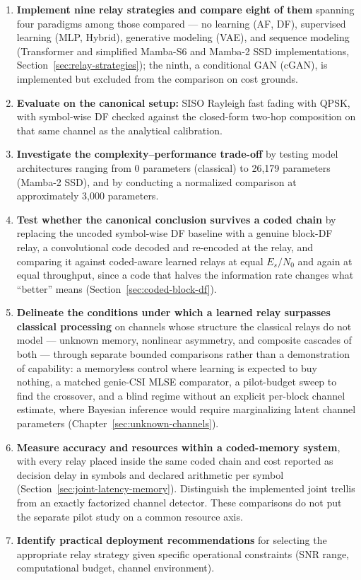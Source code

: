\begin{enumerate}
\def\labelenumi{\arabic{enumi}.}
\item
  \textbf{Implement nine relay strategies and compare eight of them} spanning four paradigms among those compared --- no learning (AF, DF), supervised learning (MLP, Hybrid), generative modeling (VAE), and sequence modeling (Transformer and simplified Mamba-S6 and Mamba-2 SSD implementations, Section~\ref{sec:relay-strategies}); the ninth, a conditional GAN (cGAN), is implemented but excluded from the comparison on cost grounds.
\item
  \textbf{Evaluate on the canonical setup:} SISO Rayleigh fast fading with QPSK, with symbol-wise DF checked against the closed-form two-hop composition on that same channel as the analytical calibration.
\item
  \textbf{Investigate the complexity--performance trade-off} by testing model architectures ranging from 0 parameters (classical) to 26,179 parameters (Mamba-2 SSD), and by conducting a normalized comparison at approximately 3,000 parameters.
\item
  \textbf{Test whether the canonical conclusion survives a coded chain} by replacing the uncoded symbol-wise DF baseline with a genuine block-DF relay, a convolutional code decoded and re-encoded at the relay, and comparing it against coded-aware learned relays at equal $E_s/N_0$ and again at equal throughput, since a code that halves the information rate changes what ``better'' means (Section~\ref{sec:coded-block-df}).
\item
  \textbf{Delineate the conditions under which a learned relay surpasses classical processing} on channels whose structure the classical relays do not model --- unknown memory, nonlinear asymmetry, and composite cascades of both --- through separate bounded comparisons rather than a demonstration of capability: a memoryless control where learning is expected to buy nothing, a matched genie-CSI MLSE comparator, a pilot-budget sweep to find the crossover, and a blind regime without an explicit per-block channel estimate, where Bayesian inference would require marginalizing latent channel parameters (Chapter~\ref{sec:unknown-channels}).
\item
  \textbf{Measure accuracy and resources within a coded-memory system}, with every relay placed inside the same coded chain and cost reported as decision delay in symbols and declared arithmetic per symbol (Section~\ref{sec:joint-latency-memory}). Distinguish the implemented joint trellis from an exactly factorized channel detector. These comparisons do not put the separate pilot study on a common resource axis.
\item
  \textbf{Identify practical deployment recommendations} for selecting the appropriate relay strategy given specific operational constraints (SNR range, computational budget, channel environment).
\end{enumerate}

